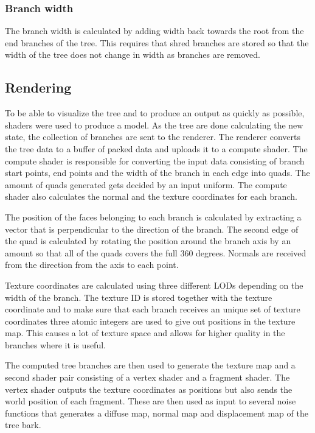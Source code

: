 \documentclass[11pt]{article} %
\begin{document}
\subsubsection{Branch width}
The branch width is calculated by adding width back towards the root from the end branches of the tree.
This requires that shred branches are stored so that the width of the tree does not change in width as branches are removed.

\subsection{Rendering}
To be able to visualize the tree and to produce an output as quickly as possible, shaders were used to produce a model.
As the tree are done calculating the new state, the collection of branches are sent to the renderer.
The renderer converts the tree data to a buffer of packed data and uploads it to a compute shader.
The compute shader is responsible for converting the input data consisting of branch start points, end points and the width of the branch in each edge into quads.
The amount of quads generated gets decided by an input uniform.
The compute shader also calculates the normal and the texture coordinates for each branch.

The position of the faces belonging to each branch is calculated by extracting a vector that is perpendicular to the direction of the branch.
The second edge of the quad is calculated by rotating the position around the branch axis by an amount so that all of the quads covers the full 360 degrees.
Normals are received from the direction from the axis to each point.

Texture coordinates are calculated using three different LODs depending on the width of the branch.
The texture ID is stored together with the texture coordinate and to make sure that each branch receives an unique set of texture coordinates three atomic integers are used to give out positions in the texture map.
This causes a lot of texture space and allows for higher quality in the branches where it is useful.

The computed tree branches are then used to generate the texture map and a second shader pair consisting of a vertex shader and a fragment shader.
The vertex shader outputs the texture coordinates as positions but also sends the world position of each fragment.
These are then used as input to several noise functions that generates a diffuse map, normal map and displacement map of the tree bark.
\end{document}
